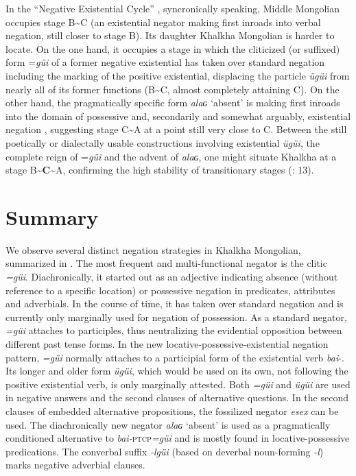 \documentclass[output=paper,colorlinks,citecolor=brown,chinesefont]{langscibook}
\begin{document}
In the “Negative Existential Cycle” \citep{Croft1991}, syncronically speaking, Middle Mongolian occupies stage B{\textasciitilde}C (an existential negator making first inroads into verbal negation, still closer to stage B). Its daughter Khalkha Mongolian is harder to locate. On the one hand, it occupies a stage in which the cliticized (or suffixed) form =\textit{güi} of a former negative existential has taken over standard negation including the marking of the positive existential, displacing the particle \textit{ügüi} from nearly all of its former functions (B{\textasciitilde}C, almost completely attaining C). On the other hand, the pragmatically specific form \textit{alaɢ} ‘absent’ is making first inroads into the domain of possessive \citep[128-129]{Brosig2015Negation} and, secondarily and somewhat arguably, existential negation \citep[137]{Veselinova2013neg.exist}, suggesting stage C{\textasciitilde}A at a point still very close to C. Between the still poetically or dialectally usable constructions involving existential \textit{ügüi}, the complete reign of =\textit{güi} and the advent of \textit{alaɢ}, one might situate Khalkha at a stage B{\textasciitilde}\textbf{C}{\textasciitilde}A, confirming the high stability of transitionary stages (\citealt{VeselinovaHamari2022intro}: 13).


\section{Summary}\label{sec:kha:5} 

We observe several distinct negation strategies in Khalkha Mongolian, summarized in . The most frequent and multi-functional negator is the clitic\textit{ =güi}. Diachronically, it started out as an adjective indicating absence (without reference to a specific location) or possessive negation in predicates, attributes and adverbials. In the course of time, it has taken over standard negation and is currently only marginally used for negation of possession. As a standard negator, \textit{=güi} attaches to participles, thus neutralizing the evidential opposition between different past tense forms.
In the new locative-possessive-existential negation pattern, \textit{=güi} normally attaches to a participial form of the existential verb \textit{bai}-. Its longer and older form \textit{ügüi}, which would be used on its own, not following the positive existential verb, is only marginally attested. Both \textit{=güi} and \textit{ügüi} are used in negative answers and the second clauses of alternative questions. In the second clauses of embedded alternative propositions, the fossilized negator \textit{esex} can be used. The diachronically new negator \textit{alaɢ} ‘absent’ is used as a pragmatically conditioned alternative to \textit{bai-}\textsc{ptcp}\textit{=güi} and is mostly found in locative-possessive predications. The converbal suffix \textit{-lgüi} (based on deverbal noun-forming \textit{-l}) marks negative adverbial clauses.
\end{document}
